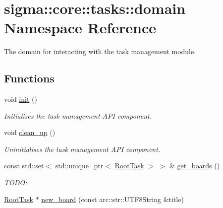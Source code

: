 \hypertarget{namespacesigma_1_1core_1_1tasks_1_1domain}{}\section{sigma\+:\+:core\+:\+:tasks\+:\+:domain Namespace Reference}
\label{namespacesigma_1_1core_1_1tasks_1_1domain}


The domain for interacting with the task management module.  


\subsection*{Functions}
\begin{DoxyCompactItemize}
\item 
void \hyperlink{namespacesigma_1_1core_1_1tasks_1_1domain_a1c9e74f15ced5d6050449521f089d293}{init} ()
\begin{DoxyCompactList}\small\item\em Initialises the task management A\+P\+I component. \end{DoxyCompactList}\item 
void \hyperlink{namespacesigma_1_1core_1_1tasks_1_1domain_a5133e92ea740e153728af3fd8d872d36}{clean\+\_\+up} ()
\begin{DoxyCompactList}\small\item\em Uninitialises the task management A\+P\+I component. \end{DoxyCompactList}\item 
\hypertarget{namespacesigma_1_1core_1_1tasks_1_1domain_ae85ad90e7ee1bf783a0da97bb553f93a}{}const std\+::set$<$ std\+::unique\+\_\+ptr$<$ \hyperlink{classsigma_1_1core_1_1tasks_1_1_root_task}{Root\+Task} $>$ $>$ \& \hyperlink{namespacesigma_1_1core_1_1tasks_1_1domain_ae85ad90e7ee1bf783a0da97bb553f93a}{get\+\_\+boards} ()\label{namespacesigma_1_1core_1_1tasks_1_1domain_ae85ad90e7ee1bf783a0da97bb553f93a}

\begin{DoxyCompactList}\small\item\em T\+O\+D\+O\+: \end{DoxyCompactList}\item 
\hypertarget{namespacesigma_1_1core_1_1tasks_1_1domain_ad580ee5a60c4d885fea6fecff72fcf8d}{}\hyperlink{classsigma_1_1core_1_1tasks_1_1_root_task}{Root\+Task} $\ast$ \hyperlink{namespacesigma_1_1core_1_1tasks_1_1domain_ad580ee5a60c4d885fea6fecff72fcf8d}{new\+\_\+board} (const arc\+::str\+::\+U\+T\+F8\+String \&title)\label{namespacesigma_1_1core_1_1tasks_1_1domain_ad580ee5a60c4d885fea6fecff72fcf8d}


\end{DoxyCompactItemize}
